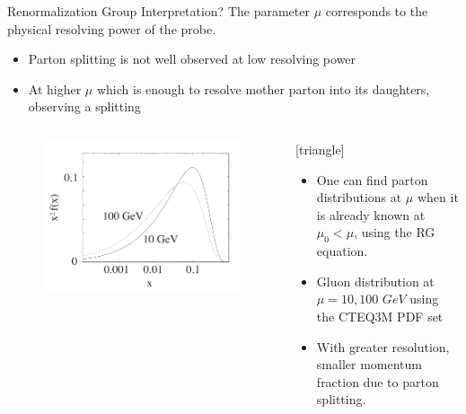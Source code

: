 \documentclass[aspectratio=169,xcolor=dvipsnames]{beamer}
\begin{document}
\begin{frame}{Renormalization Group}
	Interpretation? The parameter $\mu$ corresponds to the physical resolving power of the probe.\vskip0.1in
	\begin{itemize}
		\item Parton splitting is not well observed at low resolving power
		\item At higher $\mu$ which is enough to resolve mother parton into its daughters, observing a splitting
	\end{itemize}
	\begin{columns}[T]
		\begin{column}{.5\textwidth}
			\begin{figure}
				\includegraphics[width=.75\textwidth]{evol}
			\end{figure}
		\end{column}
		\begin{column}{.5\textwidth}
			[triangle]
			\begin{itemize}
				\item One can find parton distributions at $\mu$ when it is already known at $\mu_0 < \mu$, using the RG equation.
				\item Gluon distribution at $\mu=10,100$ $GeV$ using the CTEQ3M PDF set
				\item With greater resolution, smaller momentum fraction due to parton splitting.
			\end{itemize}
		\end{column}
	\end{columns}
\end{frame}

\end{document}
